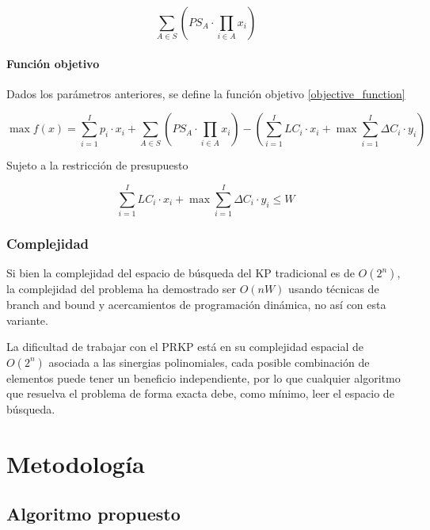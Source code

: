 \documentclass[spanish, a4paper, 12pt, twoside, openany,final]{book}
\numberwithin{equation}{section}                %
\begin{document}
    \begin{equation}
    	\label{total_sinergies_profit}
    	\sum_{A \in S}\left( PS_A \cdot \prod_{i \in A} x_i \right)
    \end{equation}
    
    
    \subsubsection{Función objetivo}
    Dados los parámetros anteriores, se define la función objetivo \ref{objective_function}
    
    \begin{center}
    	\begin{equation}
    		\max f(x) = \sum_{i=1}^I p_i\cdot x_i + 
    		\sum_{A \in S}\left( PS_A \cdot \prod_{i \in A} x_i \right)
    		- \left( \sum_{i=1}^I LC_i\cdot x_i  + \max  \sum_{i=1}^I \Delta C_i\cdot y_i \right)
    		\label{eq:objective_function}
    	\end{equation}
    \end{center}
    
    
    Sujeto a la restricción de presupuesto
    
    \begin{equation}
    	\sum_{i=1}^I LC_i\cdot x_i  + \max \sum_{i=1}^I \Delta C_i\cdot y_i \leq W        
    \end{equation}
    
    
    \subsection{Complejidad}
    Si bien la complejidad del espacio de búsqueda del KP tradicional es de $O\left( 2^n
    \right)$, la complejidad del problema ha demostrado ser $O\left( nW\right)$ usando técnicas de branch and bound y acercamientos de programación dinámica, no así con esta variante.
    
    La dificultad de trabajar con el PRKP está en su complejidad espacial de $O\left( 2^n\right)$ asociada a las sinergias polinomiales, cada posible combinación de elementos puede tener un beneficio independiente, por lo que cualquier algoritmo que resuelva el problema de forma exacta debe, como mínimo, leer el espacio de búsqueda.
\clearpage
  
\chapter{Metodología}

\section{Algoritmo propuesto}
\end{document}
